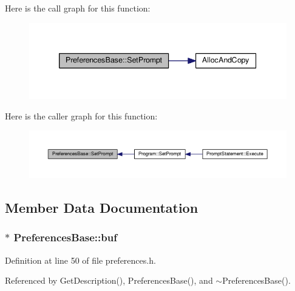 Here is the call graph for this function\+:
\nopagebreak
\begin{figure}[H]
\begin{center}
\leavevmode
\includegraphics[width=339pt]{da/de5/classPreferencesBase_a84ef7562c15ce4921ea8821e6301d302_cgraph}
\end{center}
\end{figure}




Here is the caller graph for this function\+:
\nopagebreak
\begin{figure}[H]
\begin{center}
\leavevmode
\includegraphics[width=350pt]{da/de5/classPreferencesBase_a84ef7562c15ce4921ea8821e6301d302_icgraph}
\end{center}
\end{figure}




\subsection{Member Data Documentation}
\subsubsection[{\texorpdfstring{buf}{buf}}]{$\ast$ Preferences\+Base\+::buf\hspace{0.3cm}{\ttfamily [private]}}\hypertarget{classPreferencesBase_a56ccdce81b9347c99eacb1839cee0a49}{}\label{classPreferencesBase_a56ccdce81b9347c99eacb1839cee0a49}


Definition at line 50 of file preferences.\+h.



Referenced by Get\+Description(), Preferences\+Base(), and $\sim$\+Preferences\+Base().


